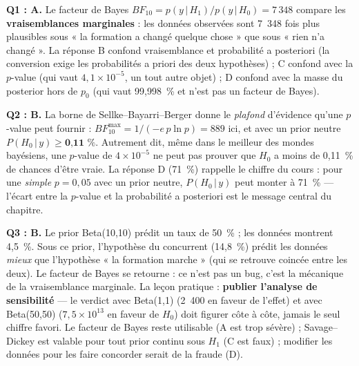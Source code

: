 \documentclass[11pt,a4paper]{article}
\newcommand{\given}{\,\vert\,}
\begin{document}
\begin{corrigebox}
\textbf{Q1 : A.} Le facteur de Bayes $BF_{10} = p(y \given H_1)/p(y \given H_0)
= 7\,348$ compare les \textbf{vraisemblances marginales} : les données
observées sont 7~348 fois plus plausibles sous « la formation a changé
quelque chose » que sous « rien n'a changé ». La réponse B confond
vraisemblance et probabilité a posteriori (la conversion exige les
probabilités a priori des deux hypothèses) ; C confond avec la $p$-value
(qui vaut $4{,}1 \times 10^{-5}$, un tout autre objet) ; D confond avec la
masse du posterior hors de $p_0$ (qui vaut 99{,}998~\% et n'est pas un
facteur de Bayes).

\textbf{Q2 : B.} La borne de Sellke--Bayarri--Berger donne le \emph{plafond}
d'évidence qu'une $p$-value peut fournir : $BF_{10}^{\max} =
1/(-e\,p\ln p) = 889$ ici, et avec un prior neutre $P(H_0 \given y) \ge
\textbf{0{,}11~\%}$. Autrement dit, même dans le meilleur des mondes
bayésiens, une $p$-value de $4 \times 10^{-5}$ ne peut pas prouver que
$H_0$ a moins de 0,11~\% de chances d'être vraie. La réponse D (71~\%)
rappelle le chiffre du cours : pour une \emph{simple} $p = 0{,}05$ avec un
prior neutre, $P(H_0 \given y)$ peut monter à 71~\% --- l'écart entre la
$p$-value et la probabilité a posteriori est le message central du chapitre.

\textbf{Q3 : B.} Le prior Beta(10,10) prédit un taux de 50~\% ; les données
montrent 4,5~\%. Sous ce prior, l'hypothèse du concurrent (14,8~\%) prédit
les données \emph{mieux} que l'hypothèse « la formation marche » (qui se
retrouve coincée entre les deux). Le facteur de Bayes se retourne : ce n'est
pas un bug, c'est la mécanique de la vraisemblance marginale. La leçon
pratique : \textbf{publier l'analyse de sensibilité} --- le verdict avec
Beta(1,1) (2~400 en faveur de l'effet) et avec Beta(50,50) ($7{,}5\times
10^{13}$ en faveur de $H_0$) doit figurer côte à côte, jamais le seul
chiffre favori. Le facteur de Bayes reste utilisable (A est trop sévère) ;
Savage--Dickey est valable pour tout prior continu sous $H_1$ (C est faux) ;
modifier les données pour les faire concorder serait de la fraude (D).
\end{corrigebox}
\end{document}
